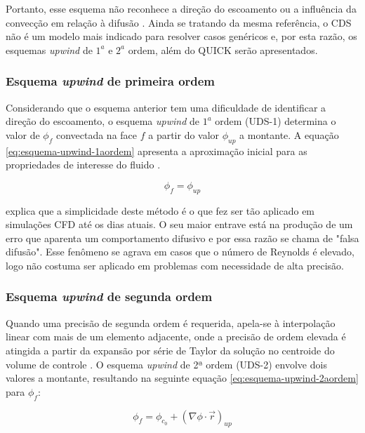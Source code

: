 Portanto, esse esquema não reconhece a direção do escoamento ou a influência da convecção em relação à difusão \cite{malalasekera2007}. Ainda se tratando da mesma referência, o CDS não é um modelo mais indicado para resolver casos genéricos e, por esta razão, os esquemas \textit{upwind} de $1^{a}$ e $2^{a}$ ordem, além do QUICK serão apresentados.

\subsubsection{Esquema \textit{upwind} de primeira ordem}

Considerando que o esquema anterior tem uma dificuldade de identificar a direção do escoamento, o esquema \textit{upwind} de $1^{a}$ ordem (UDS-1) determina o valor de $\phi_f$ convectada na face $f$ a partir do valor $\phi_{up}$ a montante. A equação \ref{eq:esquema-upwind-1aordem} apresenta a aproximação inicial para as propriedades de interesse do fluido \cite{Rezende2009}.

\begin{equation}\label{eq:esquema-upwind-1aordem}
	\phi_f = \phi_{up}
\end{equation}

\citeauthor{malalasekera2007} explica que a simplicidade deste método é o que fez ser tão aplicado em simulações CFD até os dias atuais. O seu maior entrave está na produção de um erro que aparenta um comportamento difusivo e por essa razão se chama de "falsa difusão". Esse fenômeno se agrava em casos que o número de Reynolds é elevado, logo não costuma ser aplicado em problemas com necessidade de alta precisão.

\subsubsection{Esquema \textit{upwind} de segunda ordem}

Quando uma precisão de segunda ordem é requerida, apela-se à interpolação linear com mais de um elemento adjacente, onde a precisão de ordem elevada é atingida a partir da expansão por série de Taylor da solução no centroide do volume de controle \cite{Rezende2009}. O esquema \textit{upwind} de 2ª ordem (UDS-2) envolve dois valores a montante, resultando na seguinte equação \ref{eq:esquema-upwind-2aordem} para $\phi_f$:

\begin{equation} \label{eq:esquema-upwind-2aordem}
    \phi_f = \phi_{c_0} + \left(\nabla\phi\cdot\overrightarrow{r}\right)_{up}
\end{equation}

